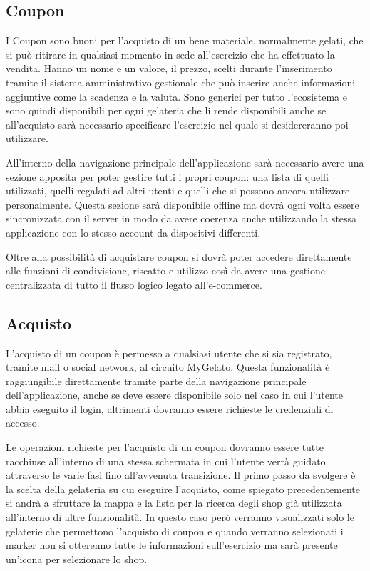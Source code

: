 \subsection{Coupon}

I Coupon sono buoni per l'acquisto di un bene materiale, normalmente
gelati, che si può ritirare in qualsiasi momento in sede all'esercizio
che ha effettuato la vendita. Hanno un nome e un valore, il prezzo,
scelti durante l'inserimento tramite il sistema amministrativo gestionale
che può inserire anche informazioni aggiuntive come la scadenza e
la valuta. Sono generici per tutto l'ecosistema e sono quindi disponibili
per ogni gelateria che li rende disponibili anche se all'acquisto
sarà necessario specificare l'esercizio nel quale si desidereranno
poi utilizzare.\bigskip{}

All'interno della navigazione principale dell'applicazione sarà necessario
avere una sezione apposita per poter gestire tutti i propri coupon:
una lista di quelli utilizzati, quelli regalati ad altri utenti e
quelli che si possono ancora utilizzare personalmente. Questa sezione
sarà disponibile offline ma dovrà ogni volta essere sincronizzata
con il server in modo da avere coerenza anche utilizzando la stessa
applicazione con lo stesso account da dispositivi differenti.\bigskip{}

Oltre alla possibilità di acquistare coupon si dovrà poter accedere
direttamente alle funzioni di condivisione, riscatto e utilizzo così
da avere una gestione centralizzata di tutto il flusso logico legato
all'e-commerce.

\subsection{Acquisto}

L'acquisto di un coupon è permesso a qualsiasi utente che si sia registrato,
tramite mail o social network, al circuito MyGelato. Questa funzionalità
è raggiungibile direttamente tramite parte della navigazione principale
dell'applicazione, anche se deve essere disponibile solo nel caso
in cui l'utente abbia eseguito il login, altrimenti dovranno essere
richieste le credenziali di accesso.\bigskip{}

Le operazioni richieste per l'acquisto di un coupon dovranno essere
tutte racchiuse all'interno di una stessa schermata in cui l'utente
verrà guidato attraverso le varie fasi fino all'avvenuta transizione.
Il primo passo da svolgere è la scelta della gelateria su cui eseguire
l'acquisto, come spiegato precedentemente si andrà a sfruttare la
mappa e la lista per la ricerca degli shop già utilizzata all'interno
di altre funzionalità. In questo caso però verranno visualizzati solo
le gelaterie che permettono l'acquisto di coupon e quando verranno
selezionati i marker non si otterenno tutte le informazioni sull'esercizio
ma sarà presente un'icona per selezionare lo shop.\bigskip{}

